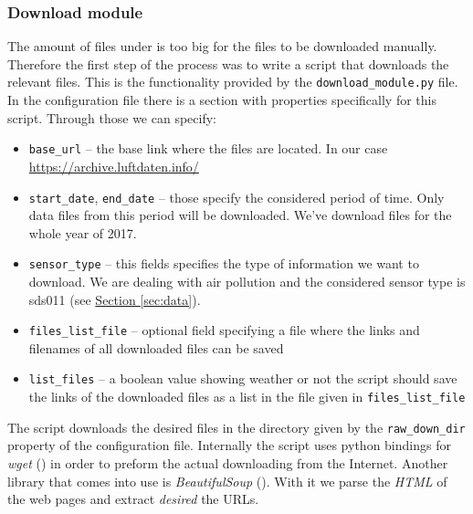 \documentclass[12pt,a4paper,twoside]{scrartcl}
\numberwithin{equation}{section}
\newcommand{\refsec}[1]{\hyperref[#1]{Section \ref*{#1}}}
\begin{document}
\subsubsection{Download module}\label{sec:down-module}
The amount of files under \cite{datalink}  is too big for the files to be downloaded manually. Therefore the first step of the process was to write a script that downloads the relevant files. This is the functionality provided by the \texttt{download\_module.py} file. In the configuration file there is a section with properties specifically for this script. Through those we can specify:
\begin{itemize}
\item \texttt{base\_url} -- the base link where the files are located. In our case \url{https://archive.luftdaten.info/}
\item \texttt{start\_date}, \texttt{end\_date} -- those specify the considered period of time. Only data files from this period will be downloaded. We've download files for the whole year of 2017.
\item \texttt{sensor\_type} -- this fields specifies the type of information we want to download. We are dealing with air pollution and the considered sensor type is sds011 (see \refsec{sec:data}).
\item \texttt{files\_list\_file} -- optional field specifying a file where the links and filenames of all downloaded files can be saved
\item \texttt{list\_files} -- a boolean value showing weather or not the script should save the links of the downloaded files as a list in the file given in \texttt{files\_list\_file}
\end{itemize}
The script downloads the desired files in the directory given by the \texttt{raw\_down\_dir} property of the configuration file. Internally the script uses python bindings for \emph{wget} (\cite{wget}) in order to preform the actual downloading from the Internet. Another library that comes into use is \emph{BeautifulSoup} (\cite{bs}). With it we parse the \emph{HTML} of the web pages and extract \emph{desired} the URLs.
\end{document}

